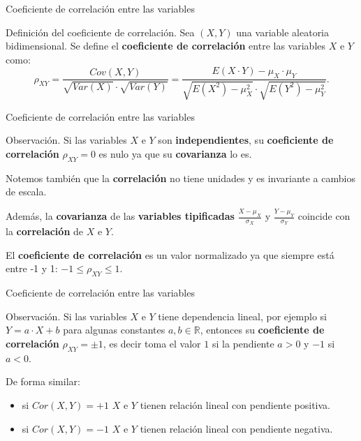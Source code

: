 \documentclass[ignorenonframetext,]{beamer}
\providecommand{\tightlist}{%
  \setlength{\itemsep}{0pt}\setlength{\parskip}{0pt}}
\begin{document}
\begin{frame}{Coeficiente de correlación entre las variables}
\protect\hypertarget{coeficiente-de-correlaciuxf3n-entre-las-variables}{}

Definición del coeficiente de correlación. Sea \((X,Y)\) una variable
aleatoria bidimensional. Se define el \textbf{coeficiente de
correlación} entre las variables \(X\) e \(Y\) como: \[
\rho_{XY}=\frac{Cov(X,Y)}{\sqrt{Var(X)}\cdot\sqrt{Var(Y)}}=\frac{E(X\cdot Y)-\mu_X\cdot \mu_Y}{\sqrt{E\left(X^2\right)-\mu_X^2}\cdot \sqrt{E\left(Y^2\right)-\mu_Y^2}}.
\]

\end{frame}

\begin{frame}{Coeficiente de correlación entre las variables}
\protect\hypertarget{coeficiente-de-correlaciuxf3n-entre-las-variables-1}{}

Observación. Si las variables \(X\) e \(Y\) son \textbf{independientes},
su \textbf{coeficiente de correlación} \(\rho_{XY}=0\) es nulo ya que su
\textbf{covarianza} lo es.

Notemos también que la \textbf{correlación} no tiene unidades y es
invariante a cambios de escala.

Además, la \textbf{covarianza} de las \textbf{variables tipificadas}
\(\frac{X-\mu_X}{\sigma_X}\) y \(\frac{Y-\mu_Y}{\sigma_Y}\) coincide con
la \textbf{correlación} de \(X\) e \(Y\).

El \textbf{coeficiente de correlación} es un valor normalizado ya que
siempre está entre -1 y 1: \(-1\leq\rho_{XY}\leq 1\).

\end{frame}

\begin{frame}{Coeficiente de correlación entre las variables}
\protect\hypertarget{coeficiente-de-correlaciuxf3n-entre-las-variables-2}{}

Observación. Si las variables \(X\) e \(Y\) tiene dependencia lineal,
por ejemplo si \(Y=a\cdot X+b\) para algunas constantes
\(a,b\in\mathbb{R}\), entonces su \textbf{coeficiente de correlación}
\(\rho_{XY}=\pm 1\), es decir toma el valor \(1\) si la pendiente
\(a>0\) y \(-1\) si \(a<0\).

De forma similar:

\begin{itemize}
\tightlist
\item
  si \(Cor(X,Y)=+1\) \(X\) e \(Y\) tienen relación lineal con pendiente
  positiva.
\item
  si \(Cor(X,Y)=-1\) \(X\) e \(Y\) tienen relación lineal con pendiente
  negativa.
\end{itemize}

\end{frame}
\end{document}
